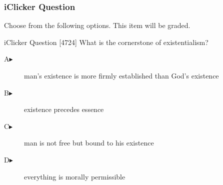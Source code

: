 \begin{frame}
  \frametitle{iClicker Question}
Choose from the following options. This item will be graded.
\begin{block}{iClicker Question}
[4724] What is the cornerstone of existentialism?
\end{block}
\begin{description}
\item[A\hspace{.2in}$\blacktriangleright$] man's existence is more firmly established than God's existence
\item[B\hspace{.2in}$\blacktriangleright$] existence precedes essence
\item[C\hspace{.2in}$\blacktriangleright$] man is not free but bound to his existence
\item[D\hspace{.2in}$\blacktriangleright$] everything is morally permissible
\end{description}
\end{frame}
